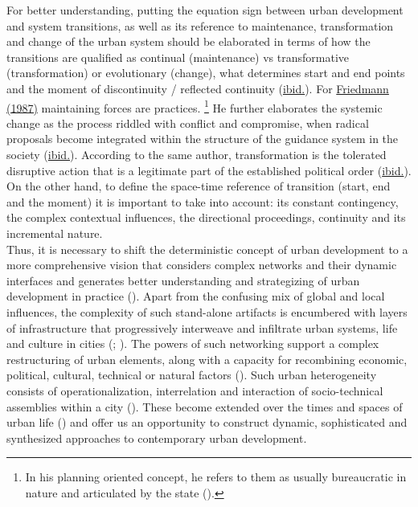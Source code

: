 \documentclass[11pt]{report}
\begin{document}
For better understanding, putting the equation sign between urban development and system transitions, as well as its reference to maintenance, transformation and change of the urban system should be elaborated in terms of how the transitions are qualified as continual (maintenance) vs transformative (transformation) or evolutionary (change), what determines start and end points and the moment of discontinuity / reflected continuity (\href{Nedovic}{ibid.}).
For \href{Friedmann}{Friedmann (1987)} maintaining forces are practices.
\footnote{In his planning oriented concept, he refers to them as usually bureaucratic in nature and articulated by the state (\href{Friedmann}{\cite{Friedmann1987}}).}
He further elaborates the systemic change as the process riddled with conflict and compromise, when radical proposals become integrated within the structure of the guidance system in the society (\href{Friedmann}{ibid.}).
According to the same author, transformation is the tolerated disruptive action that is a legitimate part of the established political order (\href{Friedmann}{ibid.}).
On the other hand, to define the space-time reference of transition (start, end and the moment) it is important to take into account: its constant contingency, the complex contextual influences, the directional proceedings, continuity and its incremental nature.
\\    

Thus, it is necessary to shift the deterministic concept of urban development to a more comprehensive vision that considers complex networks and their dynamic interfaces and generates better understanding and strategizing of urban development in practice (\href{Huang}{\cite{Huang2012}}).
Apart from the confusing mix of global and local influences, the complexity of such stand-alone artifacts is encumbered with layers of infrastructure that progressively interweave and infiltrate urban systems, life and culture in cities (\href{Graham}{\cite{Graham1998}}; \href{Portugali}{\cite{Portugali2011}}).
The powers of such networking support a complex restructuring of urban elements, along with a capacity for recombining economic, political, cultural, technical or natural factors (\href{Murdoch}{\cite{Murdoch1998}}).
Such urban heterogeneity consists of operationalization, interrelation and interaction of socio-technical assemblies within a city (\href{Graham}{\cite{GrahamAndMarvin2001}}).
These become extended over the times and spaces of urban life (\href{Mitschell}{\cite{Mitchell1996}}) and offer us an opportunity to construct dynamic, sophisticated and synthesized approaches to contemporary urban development.
\\
\end{document}
